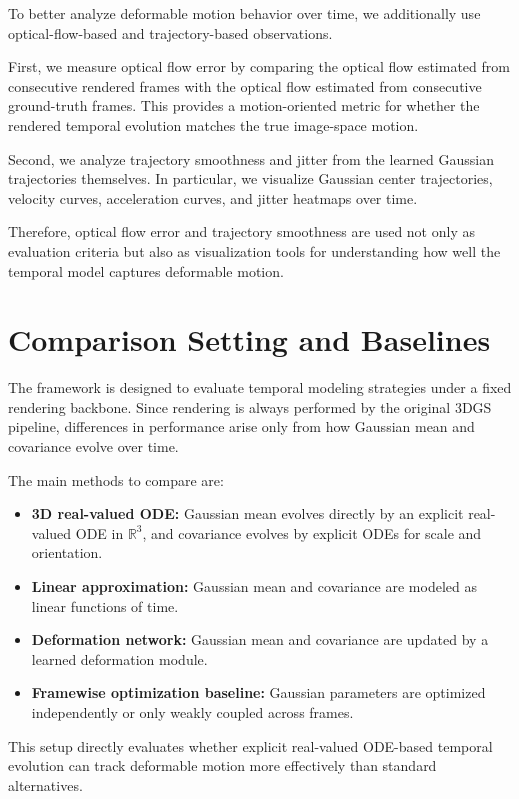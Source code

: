 \documentclass[11pt]{article}
\begin{document}
To better analyze deformable motion behavior over time, we additionally use optical-flow-based and trajectory-based observations.

First, we measure optical flow error by comparing the optical flow estimated from consecutive rendered frames with the optical flow estimated from consecutive ground-truth frames. This provides a motion-oriented metric for whether the rendered temporal evolution matches the true image-space motion.

Second, we analyze trajectory smoothness and jitter from the learned Gaussian trajectories themselves. In particular, we visualize Gaussian center trajectories, velocity curves, acceleration curves, and jitter heatmaps over time.

Therefore, optical flow error and trajectory smoothness are used not only as evaluation criteria but also as visualization tools for understanding how well the temporal model captures deformable motion.

\section{Comparison Setting and Baselines}

The framework is designed to evaluate temporal modeling strategies under a fixed rendering backbone. Since rendering is always performed by the original 3DGS pipeline, differences in performance arise only from how Gaussian mean and covariance evolve over time.

The main methods to compare are:
\begin{itemize}[leftmargin=1.5em]
    \item \textbf{3D real-valued ODE:} Gaussian mean evolves directly by an explicit real-valued ODE in $\mathbb{R}^3$, and covariance evolves by explicit ODEs for scale and orientation.
    \item \textbf{Linear approximation:} Gaussian mean and covariance are modeled as linear functions of time.
    \item \textbf{Deformation network:} Gaussian mean and covariance are updated by a learned deformation module.
    \item \textbf{Framewise optimization baseline:} Gaussian parameters are optimized independently or only weakly coupled across frames.
\end{itemize}

This setup directly evaluates whether explicit real-valued ODE-based temporal evolution can track deformable motion more effectively than standard alternatives.
\end{document}
